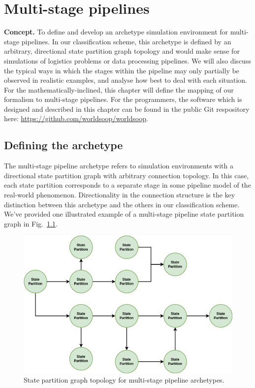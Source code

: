 \chapter{\sffamily Multi-stage pipelines}

{\bfseries\sffamily Concept.} To define and develop an archetype simulation environment for multi-stage pipelines. In our classification scheme, this archetype is defined by an arbitrary, directional state partition graph topology and would make sense for simulations of logistics problems or data processing pipelines. We will also discuss the typical ways in which the stages within the pipeline may only partially be observed in realistic examples, and analyse how best to deal with each situation. For the mathematically-inclined, this chapter will define the mapping of our formalism to multi-stage pipelines. For the programmers, the software which is designed and described in this chapter can be found in the public Git respository here: \href{https://github.com/worldsoop/worldsoop}{https://github.com/worldsoop/worldsoop}.


\section{\sffamily Defining the archetype}

The multi-stage pipeline archetype refers to simulation environments with a directional state partition graph with arbitrary connection topology. In this case, each state partition corresponds to a separate stage in some pipeline model of the real-world phenomenon. Directionality in the connection structure is the key distinction between this archetype and the others in our classification scheme. We've provided one illustrated example of a multi-stage pipeline state partition graph in Fig.~\ref{fig:state-partition-graph-multi-stage-pipelines}.

\begin{figure}[h]
\centering
\includegraphics[width=12cm]{images/chapter-9-state-partition-graph.drawio.png}
\caption{State partition graph topology for multi-stage pipeline archetypes.}
\label{fig:state-partition-graph-multi-stage-pipelines}
\end{figure}

